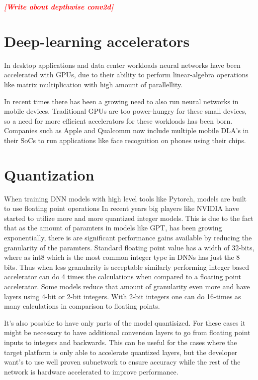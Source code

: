 \documentclass[12pt,a4paper,english
]{tunithesis}
\newcommand{\fixthis}[1]{\textbf{\textit{\textcolor{red}{[#1]}}}}
\begin{document}
\fixthis{Write about depthwise conv2d}

\section{Deep-learning accelerators}
\label{sec:dlas}
In desktop applications and data center workloads neural networks have been accelerated with GPUs, due to their ability to perform linear-algebra operations like matrix multiplication with high amount of parallellity.

In recent times there has been a growing need to also run neural networks in mobile devices. Traditional GPUs are too power-hungry for these small devices, so a need for more efficient accelerators for these workloads has been born. Companies such as Apple and Qualcomm now include multiple mobile DLA's in their SoCs to run applications like face recognition on phones using their chips.

\section{Quantization}
When training DNN models with high level tools like Pytorch, models are built to use floating point operations In recent years big players like NVIDIA have started to utilize more and more quantized integer models. This is due to the fact that as the amount of paramters in models like GPT, has been growing exponentially, there is are significant performance gains available by reducing the granularity of the paramters. Standard floating point value has a width of 32-bits, where as int8 which is the most common integer type in DNNs has just the 8 bits. Thus when less granularity is acceptable similarly performing integer based accelerator can do 4 times the calculations when compared to a floating point accelerator.
Some models reduce that amount of granularity even more and have layers using 4-bit or 2-bit integers. With 2-bit integers one can do 16-times as many calculations in comparison to floating points.

It's also possbile to have only parts of the model quantisized. For these cases it might be necessary to have additional conversion layers to go from floating point inputs to integers and backwards. This can be useful for the cases where the target platform is only able to accelerate quantized layers, but the developer want's to use well proven subnetwork to ensure accuracy while the rest of the network is hardware accelerated to improve performance.
\end{document}
